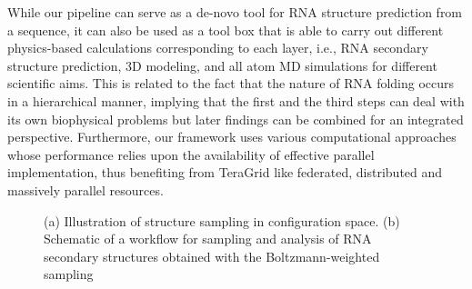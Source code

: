 \documentclass[a4paper,10pt]{article}
\newcommand{\up}{\vspace*{-1em}}
\begin{document}
While our pipeline can serve as a de-novo tool for RNA structure prediction from a sequence, it can also be used as a tool box that is able to carry out different physics-based calculations corresponding to each layer, i.e., RNA secondary structure prediction, 3D modeling, and all atom MD simulations for different scientific aims.  This is related to the fact that the nature of RNA folding occurs in a hierarchical manner, implying that the first and the third steps can deal with its own biophysical problems but later findings can be combined for an integrated perspective. Furthermore, our framework uses various computational approaches whose performance relies upon the availability of effective parallel implementation, thus benefiting from TeraGrid like federated, distributed and massively parallel resources.

\begin{figure}
\begin{center}
\end{center}
\up\up
\caption{(a) Illustration of structure sampling in configuration space.  (b) Schematic of a workflow for sampling and analysis of RNA secondary structures obtained with the Boltzmann-weighted sampling}
\label{fig:folding energy landscape}
\end{figure}
\end{document}

